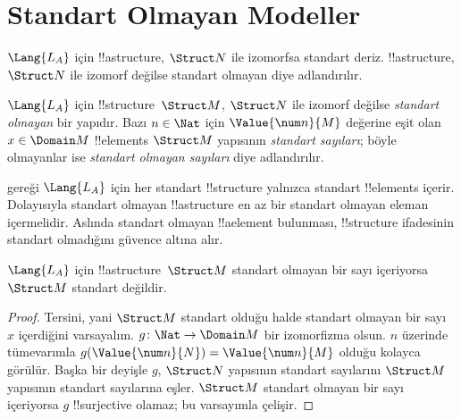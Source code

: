 \documentclass[../../../include/open-logic-section]{subfiles}
\begin{document}
\section{Standart Olmayan Modeller}

\begin{explain}
$\Lang{L_A}$ için !!a{structure}, $\Struct N$ ile izomorfsa standart
deriz. !!a{structure}, $\Struct N$ ile izomorf değilse standart olmayan
diye adlandırılır.
\end{explain}

\begin{defn}
$\Lang{L_A}$ için !!{structure}~$\Struct M$, $\Struct N$ ile izomorf
değilse \emph{standart olmayan} bir yapıdır. Bazı $n\in\Nat$ için
$\Value{\num n}{M}$ değerine eşit olan $x\in\Domain M$ !!{element}s
$\Struct M$ yapısının \emph{standart sayıları}; böyle olmayanlar ise
\emph{standart olmayan sayıları} diye adlandırılır.
\end{defn}

\begin{explain}
 gereği $\Lang{L_A}$ için her standart
!!{structure} yalnızca standart !!{element}s içerir. Dolayısıyla
standart olmayan !!a{structure} en az bir standart olmayan eleman
içermelidir. Aslında standart olmayan !!a{element} bulunması,
!!{structure} ifadesinin standart olmadığını güvence altına alır.
\end{explain}

\begin{prop}
$\Lang{L_A}$ için !!a{structure}~$\Struct M$ standart olmayan bir sayı
içeriyorsa $\Struct M$ standart değildir.
\end{prop}

\begin{proof}
Tersini, yani $\Struct M$ standart olduğu halde standart olmayan bir
sayı~$x$ içerdiğini varsayalım. $g\colon\Nat\to\Domain M$ bir
izomorfizma olsun. $n$ üzerinde tümevarımla
$g(\Value{\num n}{N})=\Value{\num n}{M}$ olduğu kolayca görülür.
Başka bir deyişle $g$, $\Struct N$ yapısının standart sayılarını
$\Struct M$ yapısının standart sayılarına eşler. $\Struct M$ standart
olmayan bir sayı içeriyorsa $g$ !!{surjective} olamaz; bu varsayımla
çelişir.
\end{proof}
\end{document}
